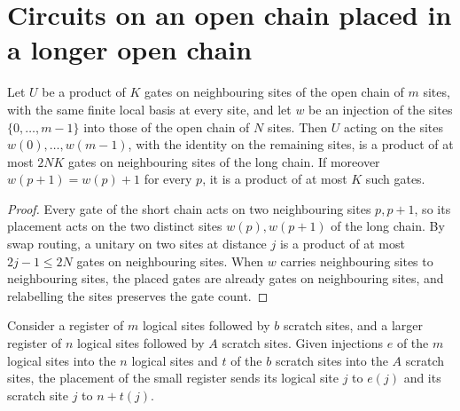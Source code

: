 \section{Circuits on an open chain placed in a longer open chain}
\label{sec:circuitplacement_chain}

\begin{lemma}
    \label{lem:chain_circuit_placement}
    \leanok
    Let $U$ be a product of $K$ gates on neighbouring sites of the open chain of
    $m$ sites, with the same finite local basis at every site, and let
    $w$ be an injection of the sites $\{0,\dots,m-1\}$ into those of the open
    chain of $N$ sites. Then $U$ acting on the sites $w(0),\dots,w(m-1)$, with
    the identity on the remaining sites, is a product of at most $2NK$ gates on
    neighbouring sites of the long chain. If moreover $w(p+1)=w(p)+1$ for every
    $p$, it is a product of at most $K$ such gates.
\end{lemma}

\begin{proof}\leanok
    Every gate of the short chain acts on two neighbouring sites $p,p+1$, so its
    placement acts on the two distinct sites $w(p),w(p+1)$ of the long chain.
    By swap routing, a unitary on two sites at distance $j$ is a product of at
    most $2j-1\leq 2N$ gates on neighbouring sites. When $w$ carries
    neighbouring sites to neighbouring sites, the placed gates are already gates
    on neighbouring sites, and relabelling the sites preserves the gate count.
\end{proof}

\begin{definition}
    \label{def:clean_circuit_placement_sites}
    \leanok
    Consider a register of $m$ logical sites followed by $b$ scratch sites, and
    a larger register of $n$ logical sites followed by $A$ scratch sites. Given
    injections $e$ of the $m$ logical sites into the $n$ logical sites and $t$ of
    the $b$ scratch sites into the $A$ scratch sites, the placement of the small
    register sends its logical site $j$ to $e(j)$ and its scratch site $j$ to
    $n+t(j)$.
\end{definition}

